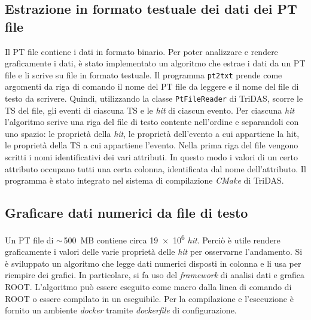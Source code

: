 \documentclass[../main.tex]{subfiles}
\begin{document}
\subsection{Estrazione in formato testuale dei dati dei PT file}
\label{sct:pt2txt}
Il PT file contiene i dati in formato binario. Per poter analizzare e rendere graficamente i dati, è stato implementato un algoritmo che estrae i dati da un PT file e li scrive su file in formato testuale.
Il programma \texttt{pt2txt} prende come argomenti da riga di comando il nome del PT file da leggere e il nome del file di testo da scrivere. 
Quindi, utilizzando la classe \texttt{PtFileReader} di TriDAS, scorre le TS del file, gli eventi di ciascuna TS e le \emph{hit} di ciascun evento. Per ciascuna \emph{hit} l'algoritmo scrive una riga del file di testo contente nell'ordine e separandoli con uno spazio: le proprietà della \emph{hit}, le proprietà dell'evento a cui appartiene la hit, le proprietà della TS a cui appartiene l'evento.
Nella prima riga del file vengono scritti i nomi identificativi dei vari attributi. In questo modo i valori di un certo attributo occupano tutti una certa colonna, identificata dal nome dell'attributo.
Il programma è stato integrato nel sistema di compilazione \emph{CMake} di TriDAS.

%
\subsection{Graficare dati numerici da file di testo}
Un PT file di $\small\sim$\SI{500}{MB} contiene circa \SI{19e6}{} \emph{hit}. Perciò è utile rendere graficamente i valori delle varie proprietà delle \emph{hit} per osservarne l'andamento. Si è sviluppato un algoritmo che legge dati numerici disposti in colonna e li usa per riempire dei grafici. In particolare, si fa uso del \emph{framework} di analisi dati e grafica ROOT. L'algoritmo può essere eseguito come macro dalla linea di comando di ROOT o essere compilato in un eseguibile. Per la compilazione e l'esecuzione è fornito un ambiente \emph{docker} tramite \emph{dockerfile} di configurazione.
\end{document}
